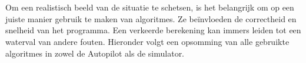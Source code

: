 
\\
\\
Om een realistisch beeld van de situatie te schetsen, is het belangrijk om op een juiste manier gebruik te maken van algoritmes. Ze be\"invloeden de correctheid en snelheid van het programma. Een verkeerde berekening kan immers leiden tot een waterval van andere fouten. Hieronder volgt een opsomming van alle gebruikte algoritmes in zowel de Autopilot als de simulator.
